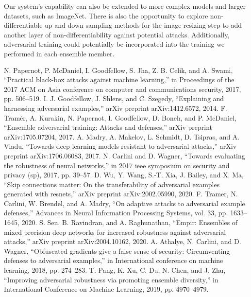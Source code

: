 \documentclass[10pt,journal,compsoc]{IEEEtran}
\begin{document}
Our system's capability can also be extended to more complex models and larger datasets, such as ImageNet. There is also the opportunity to explore non-differentiable up and down sampling methods for the image resizing step to add another layer of non-differentiability against potential attacks. Additionally, adversarial training could potentially be incorporated into the training we performed in each ensemble member. 




% 
%
\begin{thebibliography}{}
  N. Papernot, P. McDaniel, I. Goodfellow, S. Jha, Z. B. Celik, and A. Swami, “Practical black-box attacks against machine learning,” in Proceedings of the 2017 ACM on Asia conference on computer and communications security, 2017, pp. 506–519.
  I. J. Goodfellow, J. Shlens, and C. Szegedy, “Explaining and harnessing adversarial examples,” arXiv preprint arXiv:1412.6572, 2014.
  F. Tramèr, A. Kurakin, N. Papernot, I. Goodfellow, D. Boneh, and P. McDaniel, “Ensemble adversarial training: Attacks and defenses,” arXiv preprint arXiv:1705.07204, 2017.
  A. Madry, A. Makelov, L. Schmidt, D. Tsipras, and A. Vladu, “Towards deep learning models resistant to adversarial attacks,” arXiv preprint arXiv:1706.06083, 2017.
  N. Carlini and D. Wagner, “Towards evaluating the robustness of neural networks,” in 2017 ieee symposium on security and privacy (sp), 2017, pp. 39–57.
  D. Wu, Y. Wang, S.-T. Xia, J. Bailey, and X. Ma, “Skip connections matter: On the transferability of adversarial examples generated with resnets,” arXiv preprint arXiv:2002.05990, 2020.
  F. Tramer, N. Carlini, W. Brendel, and A. Madry, “On adaptive attacks to adversarial example defenses,” Advances in Neural Information Processing Systems, vol. 33, pp. 1633–1645, 2020.
  S. Sen, B. Ravindran, and A. Raghunathan, “Empir: Ensembles of mixed precision deep networks for increased robustness against adversarial attacks,” arXiv preprint arXiv:2004.10162, 2020.
  A. Athalye, N. Carlini, and D. Wagner, “Obfuscated gradients give a false sense of security: Circumventing defenses to adversarial examples,” in International conference on machine learning, 2018, pp. 274–283.
  T. Pang, K. Xu, C. Du, N. Chen, and J. Zhu, “Improving adversarial robustness via promoting ensemble diversity,” in International Conference on Machine Learning, 2019, pp. 4970–4979.

\end{thebibliography}
\end{document}
